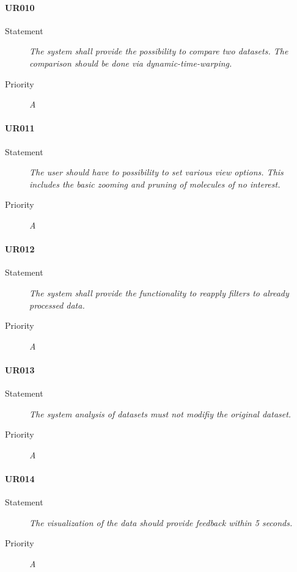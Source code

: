 \paragraph{UR010}
\begin{description}
    \item[Statement]
        \textit{The system shall provide the possibility to compare two datasets. The comparison should be done via dynamic-time-warping.}
    \item [Priority] \textit{A}
\end{description}

\paragraph{UR011}
\begin{description}
    \item[Statement]
        \textit{The user should have to possibility to set various view options. This includes the basic zooming and pruning of molecules of no interest.}
    \item [Priority] \textit{A}
\end{description}

\paragraph{UR012}
\begin{description}
    \item[Statement]
        \textit{The system shall provide the functionality to reapply filters to already processed data.}
    \item [Priority] \textit{A}
\end{description}

\paragraph{UR013}
\begin{description}
    \item[Statement]
        \textit{The system analysis of datasets must not modifiy the original dataset.}
    \item [Priority] \textit{A}
\end{description}

\paragraph{UR014}
\begin{description}
    \item[Statement]
        \textit{The visualization of the data should provide feedback within 5 seconds.}
    \item [Priority] \textit{A}
\end{description}

